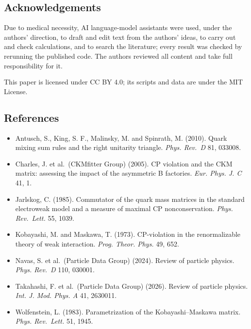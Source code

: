 \documentclass[
  11pt,
]{article}
\providecommand{\tightlist}{%
  \setlength{\itemsep}{0pt}\setlength{\parskip}{0pt}}
\begin{document}
\hypertarget{acknowledgements}{%
\subsection{Acknowledgements}\label{acknowledgements}}

Due to medical necessity, AI language-model assistants were used, under the authors' direction, to draft and edit text from the authors' ideas, to carry out and check calculations, and to search the literature; every result was checked by rerunning the published code. The authors reviewed all content and take full responsibility for it.

This paper is licensed under CC BY 4.0; its scripts and data are under the MIT License.

\hypertarget{references}{%
\subsection{References}\label{references}}

\begin{itemize}
\tightlist
\item
  Antusch, S., King, S. F., Malinsky, M. and Spinrath, M. (2010). Quark mixing sum rules and the right unitarity triangle. \emph{Phys. Rev.~D} 81, 033008.
\item
  Charles, J. et al.~(CKMfitter Group) (2005). CP violation and the CKM matrix: assessing the impact of the asymmetric B factories. \emph{Eur. Phys. J. C} 41, 1.
\item
  Jarlskog, C. (1985). Commutator of the quark mass matrices in the standard electroweak model and a measure of maximal CP nonconservation. \emph{Phys. Rev.~Lett.} 55, 1039.
\item
  Kobayashi, M. and Maskawa, T. (1973). CP-violation in the renormalizable theory of weak interaction. \emph{Prog. Theor. Phys.} 49, 652.
\item
  Navas, S. et al.~(Particle Data Group) (2024). Review of particle physics. \emph{Phys. Rev.~D} 110, 030001.
\item
  Takahashi, F. et al.~(Particle Data Group) (2026). Review of particle physics. \emph{Int. J. Mod. Phys. A} 41, 2630011.
\item
  Wolfenstein, L. (1983). Parametrization of the Kobayashi--Maskawa matrix. \emph{Phys. Rev.~Lett.} 51, 1945.
\end{itemize}
\end{document}
